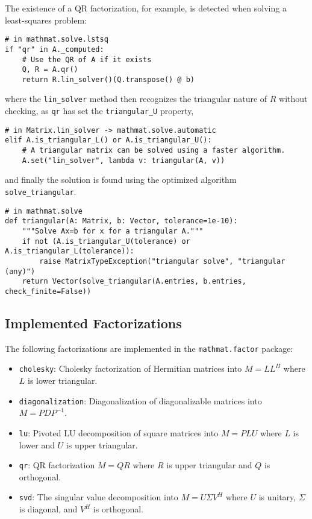 \documentclass[12pt,a4paper]{article}
\newcommand{\ct}[1]{\texttt{#1}}
\begin{document}
The existence of a QR factorization, for example, is detected when solving a least-squares problem:
\begin{verbatim}
# in mathmat.solve.lstsq
if "qr" in A._computed:
    # Use the QR of A if it exists
    Q, R = A.qr()
    return R.lin_solver()(Q.transpose() @ b)
\end{verbatim}
where the \ct{lin\_solver} method then recognizes the triangular nature of $R$ without checking, as \ct{qr} has set the \ct{triangular\_U} property,
\begin{verbatim}
# in Matrix.lin_solver -> mathmat.solve.automatic
elif A.is_triangular_L() or A.is_triangular_U():
    # A triangular matrix can be solved using a faster algorithm.
    A.set("lin_solver", lambda v: triangular(A, v))
\end{verbatim}
and finally the solution is found using the optimized algorithm \ct{solve\_triangular}.
\begin{verbatim}
# in mathmat.solve
def triangular(A: Matrix, b: Vector, tolerance=1e-10):
    """Solve Ax=b for x for a triangular A."""
    if not (A.is_triangular_U(tolerance) or A.is_triangular_L(tolerance)):
        raise MatrixTypeException("triangular solve", "triangular (any)")
    return Vector(solve_triangular(A.entries, b.entries, check_finite=False))
\end{verbatim}

\subsection{Implemented Factorizations}

The following factorizations are implemented in the \ct{mathmat.factor} package:
\begin{itemize}
    \item \ct{cholesky}: Cholesky factorization of Hermitian matrices into $M = L L^H$ where $L$ is lower triangular.
    \item \ct{diagonalization}: Diagonalization of diagonalizable matrices into $M = P D P^{-1}$.
    \item \ct{lu}: Pivoted LU decomposition of square matrices into $M = P L U$ where $L$ is lower and $U$ is upper triangular.
    \item \ct{qr}: QR factorization $M = Q R$ where $R$ is upper triangular and $Q$ is orthogonal.
    \item \ct{svd}: The singular value decomposition into $M = U \Sigma V^H$ where $U$ is unitary, $\Sigma$ is diagonal, and $V^H$ is orthogonal.
\end{itemize}
\end{document}
